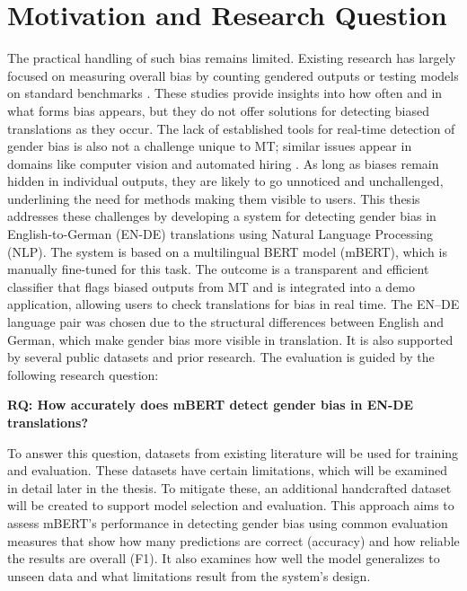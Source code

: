 \section{Motivation and Research Question}
    The practical handling of such bias remains limited. Existing research has largely focused on measuring overall bias by counting gendered outputs or testing models on standard benchmarks \parencite{rescignoGenderBiasMachine2023,barclayInvestigatingMarkersDrivers2024a,pratesAssessingGenderBias2019,savoldiWhatHarmQuantifying2024}. These studies provide insights into how often and in what forms bias appears, but they do not offer solutions for detecting biased translations as they occur. The lack of established tools for real-time detection of gender bias is also not a challenge unique to MT; similar issues appear in domains like computer vision and automated hiring \parencite{schwemmerDiagnosingGenderBias2020}. As long as biases remain hidden in individual outputs, they are likely to go unnoticed and unchallenged, underlining the need for methods making them visible to users. This thesis addresses these challenges by developing a system for detecting gender bias in English-to-German (EN-DE) translations using Natural Language Processing (NLP). The system is based on a multilingual BERT model (mBERT), which is manually fine-tuned for this task. The outcome is a transparent and efficient classifier that flags biased outputs from MT and is integrated into a demo application, allowing users to check translations for bias in real time. The EN–DE language pair was chosen due to the structural differences between English and German, which make gender bias more visible in translation. It is also supported by several public datasets and prior research. The evaluation is guided by the following research question:

    \vspace{0.8em}
    \noindent \textbf{RQ: How accurately does mBERT detect gender bias in EN-DE translations?}

    \vspace{0.8em}

    \noindent To answer this question, datasets from existing literature will be used for training and evaluation. These datasets have certain limitations, which will be examined in detail later in the thesis. To mitigate these, an additional handcrafted dataset will be created to support model selection and evaluation. This approach aims to assess mBERT's performance in detecting gender bias using common evaluation measures that show how many predictions are correct (accuracy) and how reliable the results are overall (F1). It also examines how well the model generalizes to unseen data and what limitations result from the system's design.

